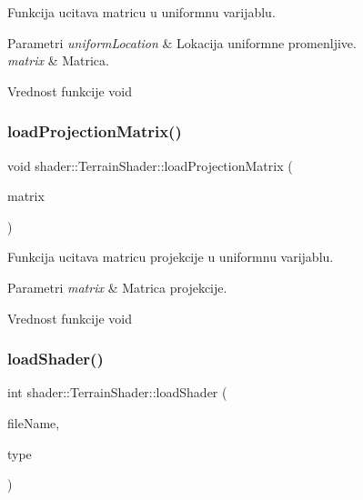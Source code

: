 Funkcija ucitava matricu u uniformnu varijablu. 


\begin{DoxyParams}{Parametri}
{\em uniform\+Location} & Lokacija uniformne promenljive. \\
\hline
{\em matrix} & Matrica. \\
\hline
\end{DoxyParams}
\begin{DoxyReturn}{Vrednost funkcije}
void 
\end{DoxyReturn}
\mbox{\label{classshader_1_1TerrainShader_a16bbac5b77cac98811441dcd1f212e77}} 
\subsubsection{\texorpdfstring{load\+Projection\+Matrix()}{loadProjectionMatrix()}}
{\footnotesize\ttfamily void shader\+::\+Terrain\+Shader\+::load\+Projection\+Matrix (\begin{DoxyParamCaption}\item[{mat4}]{matrix }\end{DoxyParamCaption})}



Funkcija ucitava matricu projekcije u uniformnu varijablu. 


\begin{DoxyParams}{Parametri}
{\em matrix} & Matrica projekcije. \\
\hline
\end{DoxyParams}
\begin{DoxyReturn}{Vrednost funkcije}
void 
\end{DoxyReturn}
\mbox{\label{classshader_1_1TerrainShader_ada18e1df5cf7306eff49886a35298ef7}} 
\subsubsection{\texorpdfstring{load\+Shader()}{loadShader()}}
{\footnotesize\ttfamily int shader\+::\+Terrain\+Shader\+::load\+Shader (\begin{DoxyParamCaption}\item[{const char $\ast$}]{file\+Name,  }\item[{G\+Lenum}]{type }\end{DoxyParamCaption})\hspace{0.3cm}{\ttfamily [private]}}



